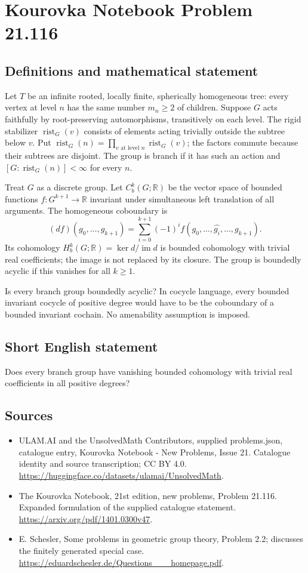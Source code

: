 \documentclass[11pt,a4paper]{article}
\begin{document}
\section*{Kourovka Notebook Problem 21.116}\label{statement}

\subsection{Definitions and mathematical statement}
Let $T$ be an infinite rooted, locally finite, spherically homogeneous tree:
every vertex at level $n$ has the same number $m_n\geq2$ of children.
Suppose $G$ acts faithfully by root-preserving automorphisms, transitively on
each level. The rigid stabilizer $\operatorname{rist}_G(v)$ consists of elements
acting trivially outside the subtree below $v$. Put
$\operatorname{rist}_G(n)=\prod_{v\text{ at level }n}\operatorname{rist}_G(v)$;
the factors commute because their subtrees are disjoint.
The group is branch if it has such an action and
$[G:\operatorname{rist}_G(n)]<\infty$ for every $n$.

Treat $G$ as a discrete group. Let $C_b^k(G;\mathbb R)$ be the vector space
of bounded functions $f:G^{k+1}\to\mathbb R$ invariant under simultaneous
left translation of all arguments. The homogeneous coboundary is
\[
(df)(g_0,\ldots,g_{k+1})=
\sum_{i=0}^{k+1}(-1)^i f(g_0,\ldots,\widehat{g_i},\ldots,g_{k+1}).
\]
Its cohomology $H_b^k(G;\mathbb R)=\ker d/\operatorname{im}d$ is bounded
cohomology with trivial real coefficients; the image is not replaced by its
closure. The group is boundedly acyclic if this vanishes for all $k\geq1$.

Is every branch group boundedly acyclic? In cocycle language, every bounded
invariant cocycle of positive degree would have to be the coboundary of a
bounded invariant cochain. No amenability assumption is imposed.
\subsection{Short English statement}
Does every branch group have vanishing bounded cohomology with trivial real coefficients in all positive degrees?
\subsection{Sources}
\begin{itemize}
\item[S1] ULAM.AI and the UnsolvedMath Contributors, supplied problems.json, catalogue entry, Kourovka Notebook - New Problems, Issue 21. Catalogue identity and source transcription; CC BY 4.0.
\url{https://huggingface.co/datasets/ulamai/UnsolvedMath}.
\item[S2] The Kourovka Notebook, 21st edition, new problems, Problem 21.116. Expanded formulation of the supplied catalogue statement.
\url{https://arxiv.org/pdf/1401.0300v47}.
\item[S3] E. Schesler, Some problems in geometric group theory, Problem 2.2; discusses the finitely generated special case.
\url{https://eduardschesler.de/Questions___homepage.pdf}.
\end{itemize}
\end{document}
